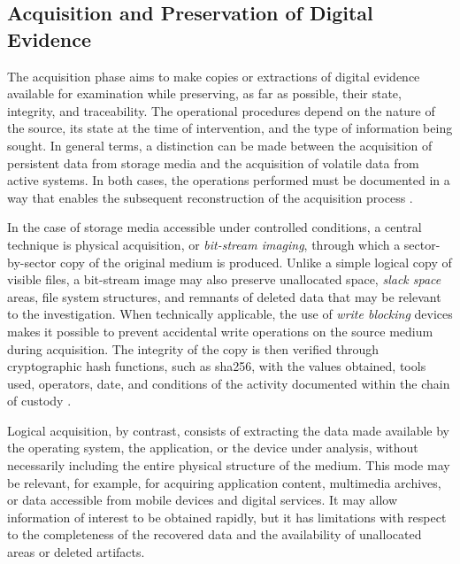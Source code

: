 \subsection{Acquisition and Preservation of Digital Evidence}
\label{subsec:background_acquisition_preservation}
The acquisition phase aims to make copies or extractions of digital evidence
available for examination while preserving, as far as possible, their state,
integrity, and traceability. The operational procedures depend on the nature of
the source, its state at the time of intervention, and the type of information
being sought. In general terms, a distinction can be made between the
acquisition of persistent data from storage media and the acquisition of
volatile data from active systems. In both cases, the operations performed must
be documented in a way that enables the subsequent reconstruction of the
acquisition process \cite{nist2006guide,iso27037,casey2011digital}.

In the case of storage media accessible under controlled conditions, a central
technique is physical acquisition, or \textit{bit-stream imaging}, through
which a sector-by-sector copy of the original medium is produced. Unlike a
simple logical copy of visible files, a bit-stream image may also preserve
unallocated space, \textit{slack space} areas, file system structures, and
remnants of deleted data that may be relevant to the investigation. When
technically applicable, the use of \textit{write blocking} devices makes it
possible to prevent accidental write operations on the source medium during
acquisition. The integrity of the copy is then verified through cryptographic
hash functions, such as \gls{sha256}, with the values obtained, tools used,
operators, date, and conditions of the activity documented within the chain of
custody \cite{carrier2005filesystem,iso27037,swgde_guidelines}.

Logical acquisition, by contrast, consists of extracting the data made
available by the operating system, the application, or the device under
analysis, without necessarily including the entire physical structure of the
medium. This mode may be relevant, for example, for acquiring application
content, multimedia archives, or data accessible from mobile devices and
digital services. It may allow information of interest to be obtained rapidly,
but it has limitations with respect to the completeness of the recovered data
and the availability of unallocated areas or deleted artifacts.

